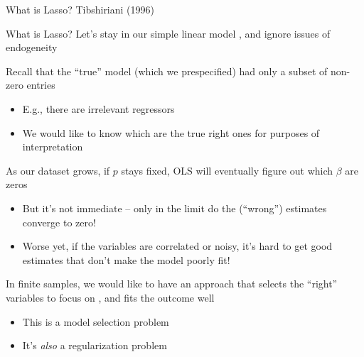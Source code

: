 \documentclass[notes,11pt, aspectratio=169]{beamer}
\newenvironment{wideitemize}{\itemize\addtolength{\itemsep}{10pt}}{\enditemize}
\begin{document}
\begin{frame}{What is Lasso? Tibshiriani (1996)}
  \begin{wideitemize}
  \item What is Lasso?  Let's stay in our simple linear model , and
    ignore issues of endogeneity
  \item Recall that the ``true'' model (which we prespecified) had only a subset of non-zero entries
    \begin{itemize}
    \item E.g., there are irrelevant regressors
    \item We would like to know which are the true right ones for purposes of interpretation
    \end{itemize}
  \item As our dataset grows, if $p$ stays fixed, OLS will eventually
    figure out which $\beta$ are zeros
    \begin{itemize}
    \item But it's not immediate -- only in the limit do the
      (``wrong'') estimates converge to zero!
    \item Worse yet, if the variables are correlated or noisy, it's
      hard to get good estimates that don't make the model poorly fit!
    \end{itemize}
  \item In finite samples, we would like to have an approach that
    selects the ``right'' variables to focus on , and fits the outcome well
    \begin{itemize}
    \item This is a model selection problem
    \item It's \emph{also} a regularization problem
    \end{itemize}
  \end{wideitemize}
\end{frame}
\end{document}

